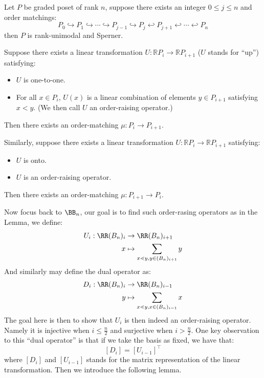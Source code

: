 \begin{proposition}
	Let \( P \) be graded poset of rank \( n \), suppose there exists an integer \( 0\leq j \leq n \)
	and order matchings:
	\[
		P_0 \hookrightarrow P_1 \hookrightarrow \cdots \hookrightarrow P_{j-1} \hookrightarrow P_j
		\hookleftarrow P_{j+1} \hookleftarrow \cdots \hookleftarrow P_n
	\]
	then \( P \) is rank-unimodal and Sperner.
\end{proposition}

\begin{lemma}
	Suppose there exists a linear transformation $U : \mathbb{R}P_i \to \mathbb{R}P_{i+1}$ ($U$ stands for ``up'') satisfying:

	\begin{itemize}
		\item $U$ is one-to-one.
		\item For all $x \in P_i$, $U(x)$ is a linear combination of elements $y \in P_{i+1}$ satisfying $x < y$. (We then call $U$ an order-raising operator.)
	\end{itemize}

	Then there exists an order-matching $\mu : P_i \to P_{i+1}$.

	Similarly, suppose there exists a linear transformation $U : \mathbb{R}P_i \to \mathbb{R}P_{i+1}$ satisfying:

	\begin{itemize}
		\item $U$ is onto.
		\item $U$ is an order-raising operator.
	\end{itemize}

	Then there exists an order-matching $\mu : P_{i+1} \to P_i$.
\end{lemma}
Now focus back to \( \BB_n \), our goal is to find such order-rasing operators as in the Lemma, we
define:
\[
	\begin{aligned}
		U_i: \RR (B_n)_i & \to \RR (B_n)_{i+1}                              \\
		x                & \mapsto \sum_{x \lessdot y, y \in (B_n)_{i+1}} y
	\end{aligned}
\]
And similarly may define the dual operator as:
\[
	\begin{aligned}
		D_i: \RR (B_n)_i & \to \RR (B_n)_{i-1}                              \\
		y                & \mapsto \sum_{x \lessdot y, x \in (B_n)_{i-1}} x
	\end{aligned}
\]
The goal here is then to show that \( U_i \) is then indeed an order-raising operator. Namely it is
injective when \( i \leq \frac{n}{2} \) and surjective when \( i > \frac{n}{2} \). One key
observation to this ``dual operator'' is that if we take the basis as fixed, we have that:
\[
	[D_i] = [U_{i-1}]^{\intercal}
\]
where \( [D_i] \) and \( [U_{i-1}] \) stands for the matrix representation of the linear
transformation. Then we introduce the following lemma.

